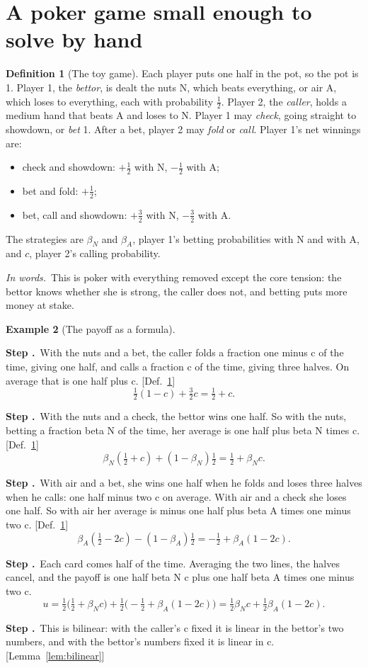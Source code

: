 \documentclass[11pt]{article}
\theoremstyle{definition}
\newtheorem{definition}{Definition}[section]
\newtheorem{example}[definition]{Example}
\newcommand{\inwords}{\par\smallskip\noindent\textit{In words.}\ }
\newcounter{stp}
\newcommand{\steps}{\setcounter{stp}{0}}
\newcommand{\st}{\stepcounter{stp}\par\medskip\noindent\textbf{Step \arabic{stp}.}\ }
\newcommand{\by}[1]{\hfill{\small\color{blue!50!black}[#1]}}
\newcommand{\Def}[1]{Def.~\ref{#1}}\newcommand{\Lem}[1]{Lemma~\ref{#1}}\newcommand{\Thm}[1]{Thm.~\ref{#1}}
\begin{document}
\section{A poker game small enough to solve by hand}\label{sec:toy}
\begin{definition}[The toy game]\label{def:toy}
Each player puts one half in the pot, so the pot is 1. Player 1, the \emph{bettor}, is dealt the nuts N, which beats
everything, or air A, which loses to everything, each with probability $\tfrac12$. Player 2, the \emph{caller}, holds a
medium hand that beats A and loses to N. Player 1 may \emph{check}, going straight to showdown, or \emph{bet} 1. After a
bet, player 2 may \emph{fold} or \emph{call}. Player 1's net winnings are:
\begin{itemize}[nosep]
\item check and showdown: $+\tfrac12$ with N, $-\tfrac12$ with A;
\item bet and fold: $+\tfrac12$;
\item bet, call and showdown: $+\tfrac32$ with N, $-\tfrac32$ with A.
\end{itemize}
The strategies are $\beta_N$ and $\beta_A$, player 1's betting probabilities with N and with A, and $c$, player 2's calling
probability.
\inwords This is poker with everything removed except the core tension: the bettor knows whether she is strong, the
caller does not, and betting puts more money at stake.
\end{definition}

\begin{example}[The payoff as a formula]\label{ex:toyu}
\steps
\st With the nuts and a bet, the caller folds a fraction one minus c of the time, giving one half, and calls a fraction c
of the time, giving three halves. On average that is one half plus c. \by{\Def{def:toy}}
\[ \tfrac12(1-c)+\tfrac32c=\tfrac12+c. \]
\st With the nuts and a check, the bettor wins one half. So with the nuts, betting a fraction beta N of the time, her
average is one half plus beta N times c. \by{\Def{def:toy}}
\[ \beta_N(\tfrac12+c)+(1-\beta_N)\tfrac12=\tfrac12+\beta_Nc. \]
\st With air and a bet, she wins one half when he folds and loses three halves when he calls: one half minus two c on
average. With air and a check she loses one half. So with air her average is minus one half plus beta A times one minus
two c. \by{\Def{def:toy}}
\[ \beta_A(\tfrac12-2c)-(1-\beta_A)\tfrac12=-\tfrac12+\beta_A(1-2c). \]
\st Each card comes half of the time. Averaging the two lines, the halves cancel, and the payoff is one half beta N c plus
one half beta A times one minus two c.
\[ u=\tfrac12\big(\tfrac12+\beta_Nc\big)+\tfrac12\big(-\tfrac12+\beta_A(1-2c)\big)=\tfrac12\beta_Nc+\tfrac12\beta_A(1-2c). \]
\st This is bilinear: with the caller's c fixed it is linear in the bettor's two numbers, and with the bettor's numbers
fixed it is linear in c. \by{\Lem{lem:bilinear}}
\end{example}
\end{document}
